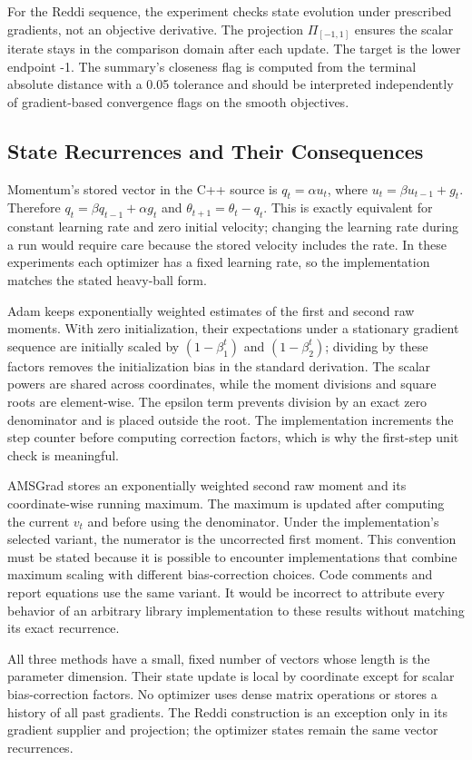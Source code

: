 ﻿\documentclass[conference]{IEEEtran}
\begin{document}
For the Reddi sequence, the experiment checks state evolution under prescribed gradients, not an objective derivative. The projection $\Pi_{[-1,1]}$ ensures the scalar iterate stays in the comparison domain after each update. The target is the lower endpoint -1. The summary's closeness flag is computed from the terminal absolute distance with a 0.05 tolerance and should be interpreted independently of gradient-based convergence flags on the smooth objectives.
\subsection{State Recurrences and Their Consequences}
Momentum's stored vector in the C++ source is $q_t=\alpha u_t$, where $u_t=\beta u_{t-1}+g_t$. Therefore $q_t=\beta q_{t-1}+\alpha g_t$ and $\theta_{t+1}=\theta_t-q_t$. This is exactly equivalent for constant learning rate and zero initial velocity; changing the learning rate during a run would require care because the stored velocity includes the rate. In these experiments each optimizer has a fixed learning rate, so the implementation matches the stated heavy-ball form.

Adam keeps exponentially weighted estimates of the first and second raw moments. With zero initialization, their expectations under a stationary gradient sequence are initially scaled by $(1-\beta_1^t)$ and $(1-\beta_2^t)$; dividing by these factors removes the initialization bias in the standard derivation. The scalar powers are shared across coordinates, while the moment divisions and square roots are element-wise. The epsilon term prevents division by an exact zero denominator and is placed outside the root. The implementation increments the step counter before computing correction factors, which is why the first-step unit check is meaningful.

AMSGrad stores an exponentially weighted second raw moment and its coordinate-wise running maximum. The maximum is updated after computing the current $v_t$ and before using the denominator. Under the implementation's selected variant, the numerator is the uncorrected first moment. This convention must be stated because it is possible to encounter implementations that combine maximum scaling with different bias-correction choices. Code comments and report equations use the same variant. It would be incorrect to attribute every behavior of an arbitrary library implementation to these results without matching its exact recurrence.

All three methods have a small, fixed number of vectors whose length is the parameter dimension. Their state update is local by coordinate except for scalar bias-correction factors. No optimizer uses dense matrix operations or stores a history of all past gradients. The Reddi construction is an exception only in its gradient supplier and projection; the optimizer states remain the same vector recurrences.
\end{document}
